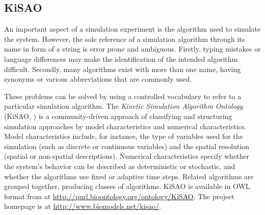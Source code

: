 \subsection{KiSAO}
\label{sec:kisao}

An important aspect of a simulation experiment is the algorithm used to simulate the system.
However, the sole reference of a simulation algorithm through its name in form of a string is error prone and ambiguous. 
Firstly, typing mistakes or language differences may make the identification of the intended algorithm difficult. 
Secondly, many algorithms exist with more than one name, having synonyms or various abbreviations that are commonly used.

These problems can be solved by using a controlled vocabulary to refer to a particular simulation algorithm. 
The \emph{Kinetic Simulation Algorithm Ontology} (KiSAO, \citep{CWK+10}) is a community-driven approach of classifying and structuring simulation approaches by model characteristics and numerical characteristics.  Model characteristics include, for instance, the type of variables used for the simulation (such as discrete or continuous variables) and the spatial resolution (spatial or non-spatial descriptions). Numerical characteristics specify whether the system's behavior can be described as deterministic or stochastic, and whether the algorithms use fixed or adaptive time steps.  
Related algorithms are grouped together, producing classes of algorithms.
KiSAO is available in OWL format from  at \url{http://purl.bioontology.org/ontology/KiSAO}. 
The project homepage is at \url{http://www.biomodels.net/kisao/}.

%
%



